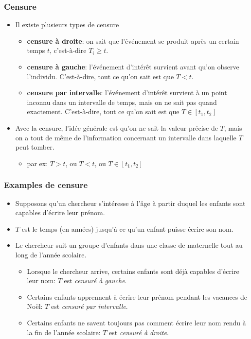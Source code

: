 \documentclass{beamer}
\begin{document}
\begin{frame}
\frametitle{Censure}
\begin{itemize}
\item Il existe plusieurs types de censure
\begin{itemize}
\vp \vp
\item \textbf{censure à droite}:  on sait que l'événement se produit après un certain temps $t$, c'est-à-dire $T_i \geq t$.
\item \textbf{censure à gauche}: l'événement d'intérêt survient avant qu'on observe l'individu. C'est-à-dire, tout ce qu'on sait est que $T<t$.
\item \textbf{censure par intervalle}: l'événement d'intérêt survient à un point inconnu dans un intervalle de temps, mais on ne sait pas quand exactement. C'est-à-dire, tout ce qu'on sait est que $T \in [t_1,t_2]$
\end{itemize}
\item Avec la censure, l'idée générale est qu'on ne sait la valeur précise de $T$, mais on a tout de même de l'information concernant un intervalle dans laquelle $T$ peut tomber.
\begin{itemize}
\vp \vp
\item par ex: $T>t$, ou $T<t$, ou $T \in [t_1,t_2]$
\end{itemize}
\end{itemize}
\end{frame}

\begin{frame}
\frametitle{Examples de censure}
\begin{itemize} \item Supposons qu'un chercheur s'intéresse à l'âge à partir duquel les enfants sont capables d'écrire leur prénom. 
\item $T$ est le temps (en années) jusqu'à ce qu'un enfant puisse écrire son nom. 
\item Le chercheur suit un groupe d'enfants dans une classe de maternelle tout au long de l'année scolaire. 
\begin{itemize} \item Lorsque le chercheur arrive, certains enfants sont déjà capables d'écrire leur nom: $T$ est \emph{censuré à gauche}. 
\item Certains enfants apprennent à écrire leur prénom pendant les vacances de Noël: $T$ est \emph{censuré par intervalle}. \item Certains enfants ne savent toujours pas comment écrire leur nom rendu à la fin de l'année scolaire:  $T$ est \emph{censuré à droite}.
\end{itemize}
\end{itemize}
\end{frame}
\end{document}
